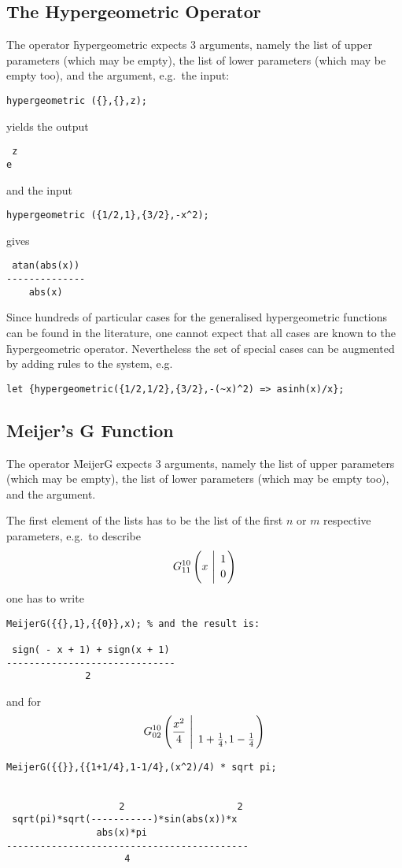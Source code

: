 \hypertarget{operator:HYPERGEOMETRIC}{}
\subsection{The Hypergeometric Operator}

The operator \f{hypergeometric} expects 3 arguments, namely the 
list of upper parameters (which may be empty), the list of lower
parameters (which may be empty too), and the argument, e.g.\ the input:
\begin{verbatim}
hypergeometric ({},{},z);
\end{verbatim}
yields the output
\begin{verbatim}
 z
e
\end{verbatim}
and the input
\begin{verbatim}
hypergeometric ({1/2,1},{3/2},-x^2);
\end{verbatim}
gives
\begin{verbatim}
 atan(abs(x))
--------------
    abs(x)
\end{verbatim}


Since hundreds of particular cases for the generalised hypergeometric
functions can be found in the literature, one cannot expect that all
cases are known to the \f{hypergeometric} operator.
Nevertheless the set of special cases can be augmented by adding
rules to the \REDUCE{} system, e.g.
\begin{verbatim}
let {hypergeometric({1/2,1/2},{3/2},-(~x)^2) => asinh(x)/x};
\end{verbatim}

\subsection{Meijer's G Function}
\hypertarget{operator:MEIJERG}{}

The operator \f{MeijerG} expects 3 arguments, namely the 
list of upper parameters (which may be empty), the list of lower
parameters (which may be empty too), and the argument.

The first element of the lists has to be the list of the
first $n$ or $m$ respective parameters, e.g.\ to describe 
\[
G_{1 1}^{1 0} \left( x \  \Bigg\vert \  \genfrac{}{}{0pt}{}{1}{0} \right)
\]
one has to write 
\begin{verbatim}
MeijerG({{},1},{{0}},x); % and the result is:

 sign( - x + 1) + sign(x + 1)
------------------------------
              2
\end{verbatim}
and for
\[
G_{0 2}^{1 0} \left( \frac{x^2}{4} \  \Bigg\vert \ \genfrac{}{}{0pt}{}{}{{1+ \frac{1}{4} },
{1-\frac{1}{4}}} \right)
\]
\begin{verbatim}
MeijerG({{}},{{1+1/4},1-1/4},(x^2)/4) * sqrt pi;


                    2                    2
 sqrt(pi)*sqrt(-----------)*sin(abs(x))*x
                abs(x)*pi
-------------------------------------------
                     4
\end{verbatim}

